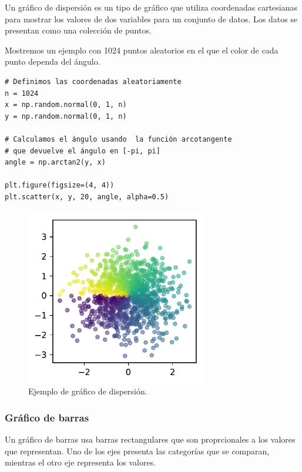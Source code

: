 Un gráfico de dispersión es un tipo de gráfico que utiliza coordenadas
cartesianas para mostrar los valores de dos variables para un conjunto
de datos. Los datos se presentan como una colección de puntos.

Mostremos un ejemplo con 1024 puntos aleatorios en el que el color de
cada punto dependa del ángulo.

\begin{listing}[H]
\begin{verbatim}
# Definimos las coordenadas aleatoriamente
n = 1024
x = np.random.normal(0, 1, n)
y = np.random.normal(0, 1, n)

# Calculamos el ángulo usando  la función arcotangente
# que devuelve el ángulo en [-pi, pi]
angle = np.arctan2(y, x)

plt.figure(figsize=(4, 4))
plt.scatter(x, y, 20, angle, alpha=0.5)
\end{verbatim}
\end{listing}

\begin{figure}[H]
	\centering
	\includegraphics[width=8cm]{img/herramientas/grafico_dispersion}
	\caption{Ejemplo de gráfico de dispersión.}
	\label{fig:grafico_dispersion}
\end{figure}

\subsubsection{Gráfico de barras}

Un gráfico de barras usa barras rectangulares que son proprcionales a
los valores que representan. Uno de los ejes presenta las categorías que
se comparan, mientras el otro eje representa los valores.

